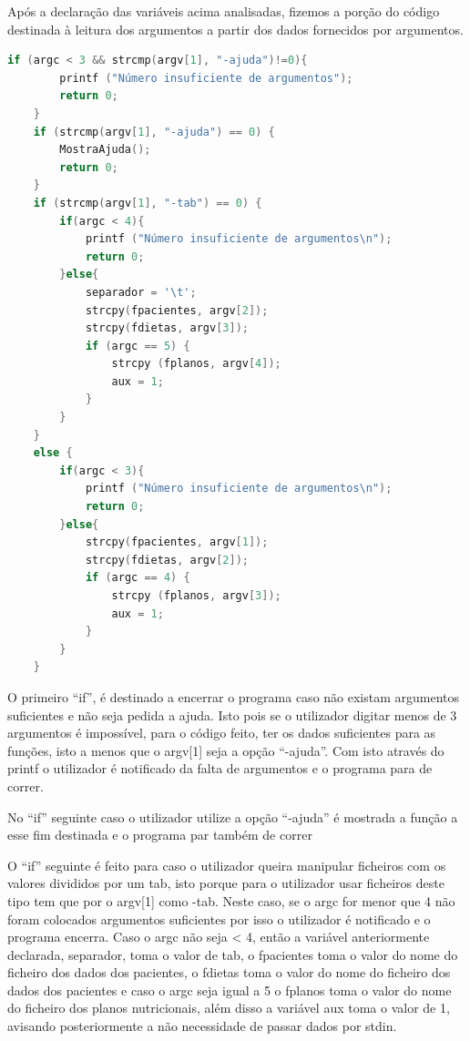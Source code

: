\documentclass[a4wide]{report}
\begin{document}
\Large
Após a declaração das variáveis acima analisadas, fizemos a porção do código destinada à leitura dos argumentos a partir dos dados fornecidos por argumentos. 

\begin{lstlisting}[language=C, caption={Código para análise argumentos}, label={lst:exemplo-c}]
if (argc < 3 && strcmp(argv[1], "-ajuda")!=0){
        printf ("Número insuficiente de argumentos");
        return 0;
    } 
    if (strcmp(argv[1], "-ajuda") == 0) {
        MostraAjuda();
        return 0;
    }
    if (strcmp(argv[1], "-tab") == 0) {
        if(argc < 4){
            printf ("Número insuficiente de argumentos\n");
            return 0;
        }else{
            separador = '\t';
            strcpy(fpacientes, argv[2]);
            strcpy(fdietas, argv[3]);
            if (argc == 5) {
                strcpy (fplanos, argv[4]);
                aux = 1;
            }
        }
    }
    else {
        if(argc < 3){
            printf ("Número insuficiente de argumentos\n");
            return 0;
        }else{
            strcpy(fpacientes, argv[1]);
            strcpy(fdietas, argv[2]);
            if (argc == 4) {
                strcpy (fplanos, argv[3]);
                aux = 1;
            }
        }
    }
\end{lstlisting}

O primeiro “if”, é destinado a encerrar o programa caso não existam argumentos suficientes e não seja pedida a ajuda. Isto pois se o utilizador digitar menos de 3 argumentos é impossível, para o código feito, ter os dados suficientes para as funções, isto a menos que o argv[1] seja a opção “-ajuda”. Com isto através do printf o utilizador é notificado da falta de argumentos e o programa para de correr. 

No “if” seguinte caso o utilizador utilize a opção “-ajuda” é mostrada a função a esse fim destinada e o programa par também de correr 

O “if” seguinte é feito para caso o utilizador queira manipular ficheiros com os valores divididos por um tab, isto porque para o utilizador usar ficheiros deste tipo tem que por o argv[1] como -tab. Neste caso, se o argc for menor que 4 não foram colocados argumentos suficientes por isso o utilizador é notificado e o programa encerra. Caso o argc não seja < 4, então a variável anteriormente declarada, separador, toma o valor de tab, o fpacientes toma o valor do nome do ficheiro dos dados dos pacientes, o fdietas toma o valor do nome do ficheiro dos dados dos pacientes e caso o argc seja igual a 5 o fplanos toma o valor do nome do ficheiro dos planos nutricionais, além disso a variável aux toma o valor de 1, avisando posteriormente a não necessidade de passar dados por stdin. 
\end{document}
